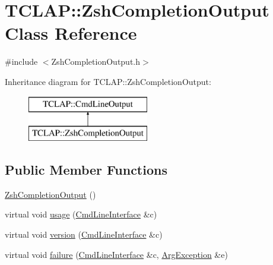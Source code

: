 \hypertarget{class_t_c_l_a_p_1_1_zsh_completion_output}{}\section{T\+C\+L\+A\+P\+:\+:Zsh\+Completion\+Output Class Reference}
\label{class_t_c_l_a_p_1_1_zsh_completion_output}


{\ttfamily \#include $<$Zsh\+Completion\+Output.\+h$>$}

Inheritance diagram for T\+C\+L\+A\+P\+:\+:Zsh\+Completion\+Output\+:\begin{figure}[H]
\begin{center}
\leavevmode
\includegraphics[height=2.000000cm]{class_t_c_l_a_p_1_1_zsh_completion_output}
\end{center}
\end{figure}
\subsection*{Public Member Functions}
\begin{DoxyCompactItemize}
\item 
\hyperlink{class_t_c_l_a_p_1_1_zsh_completion_output_a3bf15bc96487b014092eb2bc97fdf1de}{Zsh\+Completion\+Output} ()
\item 
virtual void \hyperlink{class_t_c_l_a_p_1_1_zsh_completion_output_a3ea685b174fce7ddf2353129863b49d7}{usage} (\hyperlink{class_t_c_l_a_p_1_1_cmd_line_interface}{Cmd\+Line\+Interface} \&c)
\item 
virtual void \hyperlink{class_t_c_l_a_p_1_1_zsh_completion_output_a543e705918d769d3d6f4090c403ed0c9}{version} (\hyperlink{class_t_c_l_a_p_1_1_cmd_line_interface}{Cmd\+Line\+Interface} \&c)
\item 
virtual void \hyperlink{class_t_c_l_a_p_1_1_zsh_completion_output_abcd0ba63a2ac7675d085877fc4d3e8cf}{failure} (\hyperlink{class_t_c_l_a_p_1_1_cmd_line_interface}{Cmd\+Line\+Interface} \&c, \hyperlink{class_t_c_l_a_p_1_1_arg_exception}{Arg\+Exception} \&e)
\end{DoxyCompactItemize}
